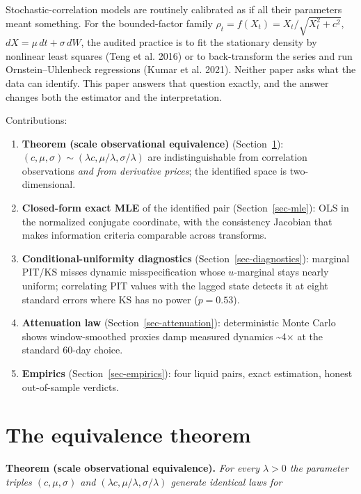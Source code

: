 \documentclass[
  english,
  10pt,
  letterpaper,
  DIV=11,
  numbers=noendperiod]{scrartcl}
\providecommand{\tightlist}{%
  \setlength{\itemsep}{0pt}\setlength{\parskip}{0pt}}
\begin{document}
Stochastic-correlation models are routinely calibrated as if all their
parameters meant something. For the bounded-factor family
\(\rho_t=f(X_t)=X_t/\sqrt{X_t^2+c^2}\), \(dX=\mu\,dt+\sigma\,dW\), the
audited practice is to fit the stationary density by nonlinear least
squares (Teng et al. 2016) or to back-transform the series and run
Ornstein--Uhlenbeck regressions (Kumar et al. 2021). Neither paper asks
what the data can identify. This paper answers that question exactly,
and the answer changes both the estimator and the interpretation.

Contributions:

\begin{enumerate}
\def\labelenumi{\arabic{enumi}.}
\tightlist
\item
  \textbf{Theorem (scale observational equivalence)}
  (Section~\ref{sec-theorem}):
  \((c,\mu,\sigma)\sim(\lambda c,\mu/\lambda,\sigma/\lambda)\) are
  indistinguishable from correlation observations \emph{and from
  derivative prices}; the identified space is two-dimensional.
\item
  \textbf{Closed-form exact MLE} of the identified pair
  (Section~\ref{sec-mle}): OLS in the normalized conjugate coordinate,
  with the consistency Jacobian that makes information criteria
  comparable across transforms.
\item
  \textbf{Conditional-uniformity diagnostics}
  (Section~\ref{sec-diagnostics}): marginal PIT/KS misses dynamic
  misspecification whose \(u\)-marginal stays nearly uniform;
  correlating PIT values with the lagged state detects it at eight
  standard errors where KS has no power (\(p=0.53\)).
\item
  \textbf{Attenuation law} (Section~\ref{sec-attenuation}):
  deterministic Monte Carlo shows window-smoothed proxies damp measured
  dynamics \textasciitilde4× at the standard 60-day choice.
\item
  \textbf{Empirics} (Section~\ref{sec-empirics}): four liquid pairs,
  exact estimation, honest out-of-sample verdicts.
\end{enumerate}

\section{The equivalence theorem}\label{sec-theorem}

\textbf{Theorem (scale observational equivalence).} \emph{For every
\(\lambda>0\) the parameter triples \((c,\mu,\sigma)\) and
\((\lambda c,\mu/\lambda,\sigma/\lambda)\) generate identical laws for}
\end{document}

